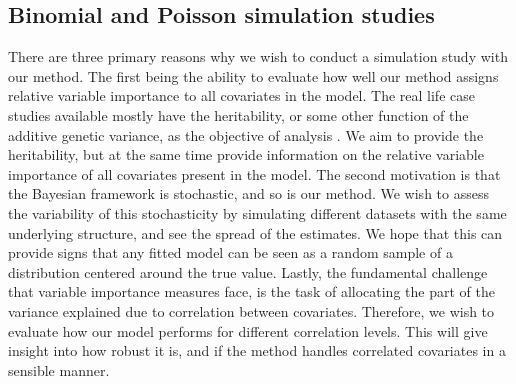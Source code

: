 \subsection{Binomial and Poisson simulation studies}
\label{sec:simulation_study}
There are three primary reasons why we wish to conduct a simulation study with our method. The first being the ability to evaluate how well our method assigns relative variable importance to all covariates in the model. The real life case studies available mostly have the heritability, or some other function of the additive genetic variance, as the objective of analysis \citep{Stensland_GMRF_bayes_animal_model}. We aim to provide the heritability, but at the same time provide information on the relative variable importance of all covariates present in the model. The second motivation is that the Bayesian framework is stochastic, and so is our method. We wish to assess the variability of this stochasticity by simulating different datasets with the same underlying structure, and see the spread of the estimates. We hope that this can provide signs that any fitted model can be seen as a random sample of a distribution centered around the true value. Lastly, the fundamental challenge that variable importance measures face, is the task of allocating the part of the variance explained due to correlation between covariates. Therefore, we wish to evaluate how our model performs for different correlation levels. This will give insight into how robust it is, and if the method handles correlated covariates in a sensible manner.
\\
\\
